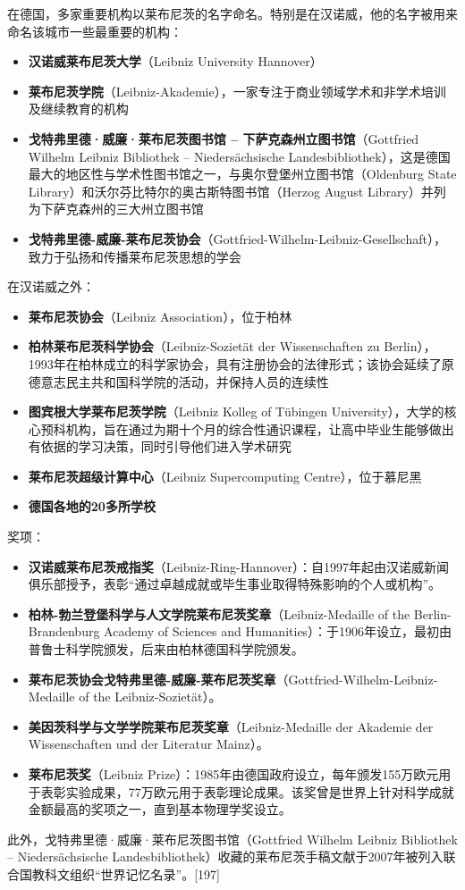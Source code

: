 在德国，多家重要机构以莱布尼茨的名字命名。特别是在汉诺威，他的名字被用来命名该城市一些最重要的机构：
\begin{itemize}
\item \textbf{汉诺威莱布尼茨大学}（Leibniz University Hannover）  
\item \textbf{莱布尼茨学院}（Leibniz-Akademie），一家专注于商业领域学术和非学术培训及继续教育的机构  
\item \textbf{戈特弗里德·威廉·莱布尼茨图书馆 – 下萨克森州立图书馆}（Gottfried Wilhelm Leibniz Bibliothek – Niedersächsische Landesbibliothek），这是德国最大的地区性与学术性图书馆之一，与奥尔登堡州立图书馆（Oldenburg State Library）和沃尔芬比特尔的奥古斯特图书馆（Herzog August Library）并列为下萨克森州的三大州立图书馆  
\item \textbf{戈特弗里德-威廉-莱布尼茨协会}（Gottfried-Wilhelm-Leibniz-Gesellschaft），致力于弘扬和传播莱布尼茨思想的学会  
\end{itemize}
在汉诺威之外：
\begin{itemize}
\item \textbf{莱布尼茨协会}（Leibniz Association），位于柏林  
\item \textbf{柏林莱布尼茨科学协会}（Leibniz-Sozietät der Wissenschaften zu Berlin），1993年在柏林成立的科学家协会，具有注册协会的法律形式；该协会延续了原德意志民主共和国科学院的活动，并保持人员的连续性  
\item \textbf{图宾根大学莱布尼茨学院}（Leibniz Kolleg of Tübingen University），大学的核心预科机构，旨在通过为期十个月的综合性通识课程，让高中毕业生能够做出有依据的学习决策，同时引导他们进入学术研究  
\item \textbf{莱布尼茨超级计算中心}（Leibniz Supercomputing Centre），位于慕尼黑  
\item \textbf{德国各地的20多所学校 } 
\end{itemize}
奖项：
\begin{itemize}
\item \textbf{汉诺威莱布尼茨戒指奖}（Leibniz-Ring-Hannover）：自1997年起由汉诺威新闻俱乐部授予，表彰“通过卓越成就或毕生事业取得特殊影响的个人或机构”。  
\item \textbf{柏林-勃兰登堡科学与人文学院莱布尼茨奖章}（Leibniz-Medaille of the Berlin-Brandenburg Academy of Sciences and Humanities）：于1906年设立，最初由普鲁士科学院颁发，后来由柏林德国科学院颁发。  
\item \textbf{莱布尼茨协会戈特弗里德-威廉-莱布尼茨奖章}（Gottfried-Wilhelm-Leibniz-Medaille of the Leibniz-Sozietät）。  
\item \textbf{美因茨科学与文学学院莱布尼茨奖章}（Leibniz-Medaille der Akademie der Wissenschaften und der Literatur Mainz）。  
\item \textbf{ 莱布尼茨奖}（Leibniz Prize）：1985年由德国政府设立，每年颁发155万欧元用于表彰实验成果，77万欧元用于表彰理论成果。该奖曾是世界上针对科学成就金额最高的奖项之一，直到基本物理学奖设立。
\end{itemize}
此外，戈特弗里德·威廉·莱布尼茨图书馆（Gottfried Wilhelm Leibniz Bibliothek – Niedersächsische Landesbibliothek）收藏的莱布尼茨手稿文献于2007年被列入联合国教科文组织“世界记忆名录”。[197]
